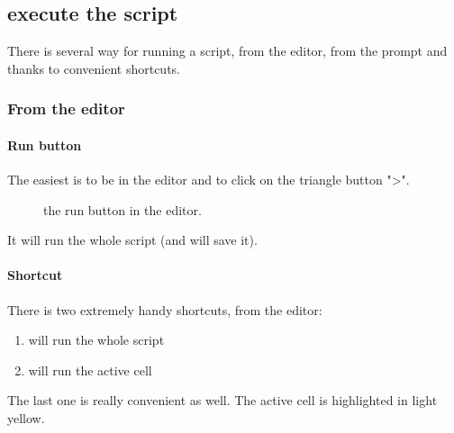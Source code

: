 	\subsection{execute the script}
		There is several way for running a script, from the editor, from the prompt and thanks to convenient shortcuts.
		\subsubsection{From the editor}
			\paragraph{Run button}
				The easiest is to be in the editor and to click on the triangle button "\textgreater".
				\begin{figure}
					\center
			\caption{
				the run button in the editor.
			}
			\label{fig-run}
		\end{figure}	

				It will run the whole script (and will save it).
		
			\paragraph{Shortcut}
				There is two extremely handy shortcuts, from the editor:
				\begin{enumerate}
					\item {} will run the whole script
					\item {} will run the active cell
				\end{enumerate}
				The last one is really convenient as well.
				The active cell is highlighted in light yellow.

